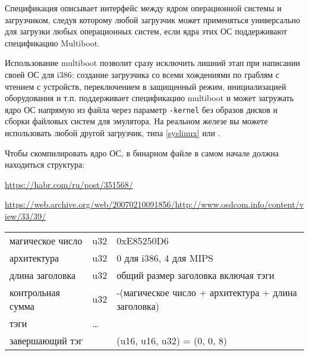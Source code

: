 \clearpage
{}\label{multiboot}

Спецификация  описывает интерфейс между ядром операционной
системы и загрузчиком, следуя которому любой загрузчик может применяться
универсально для загрузки любых операционных систем, если ядра этих ОС
поддерживают спецификацию Multiboot.

Использование multiboot позволит сразу исключить лишний этап при написании своей
ОС для i386: создание загрузчика со всеми хождениями по граблям с чтением с
устройств, переключением в защищенный режим, инициализацией оборудования и т.п.
 поддерживает спецификацию multiboot и может загружать ядро ОС
напрямую из файла через параметр \verb|-kernel| без образов дисков и сборки
файловых систем для эмулятора. На реальном железе вы можете использовать любой
другой загрузчик, типа  \ref{syslinux} или .

\clearpage
Чтобы скомпилировать ядро ОС, в бинарном файле в самом начале должна находиться
структура:
\bigskip

\noindent
\url{https://habr.com/ru/post/351568/}

\noindent
\url{https://web.archive.org/web/20070210091856/http://www.osdcom.info/content/view/33/39/}

\bigskip

\noindent
\begin{tabular}{l l l}
магическое число & u32 & 0xE85250D6 \\
архитектура	& u32 & 0 для i386, 4 для MIPS \\
длина заголовка & u32 & общий размер заголовка включая тэги \\
контрольная сумма & u32	& -(магическое число + архитектура + длина заголовка) \\
тэги & \ldots & \\
завершающий тэг & & (u16, u16, u32) = (0, 0, 8) \\
\end{tabular}

\clearpage
{}
